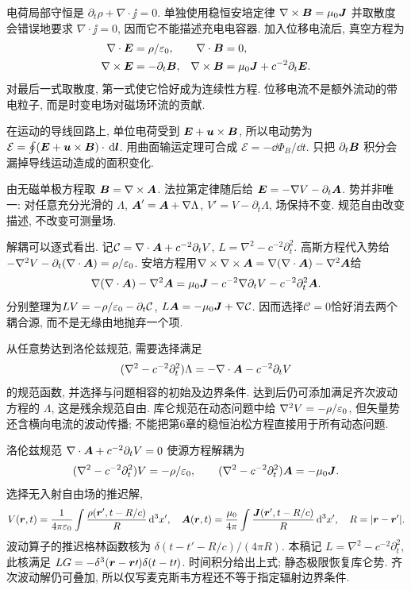 电荷局部守恒是 $\partial_t\rho+\nabla\cdot\jj=0$. 单独使用稳恒安培定律 $\nabla\times\boldsymbol{B}=\mu_0\boldsymbol{J}$ 并取散度会错误地要求 $\nabla\cdot\jj=0$, 因而它不能描述充电电容器. 加入位移电流后, 真空方程为
\begin{align}
\nabla\cdot\boldsymbol{E}&=\rho/\varepsilon_0,& \nabla\cdot\boldsymbol{B}&=0,\\
\nabla\times\boldsymbol{E}&=-\partial_t\boldsymbol{B},&
\nabla\times\boldsymbol{B}&=\mu_0\boldsymbol{J}+c^{-2}\partial_t\boldsymbol{E}.
\end{align}
对最后一式取散度, 第一式使它恰好成为连续性方程. 位移电流不是额外流动的带电粒子, 而是时变电场对磁场环流的贡献.

在运动的导线回路上, 单位电荷受到 $\boldsymbol{E}+\boldsymbol{u}\times\boldsymbol{B}$, 所以电动势为 $\mathcal E=\oint(\boldsymbol{E}+\boldsymbol{u}\times\boldsymbol{B})\cdot\,\mathrm d\boldsymbol{l}$. 用曲面输运定理可合成 $\mathcal E=-\dd\Phi_B/\dd t$. 只把 $\partial_t\boldsymbol{B}$ 积分会漏掉导线运动造成的面积变化.

由无磁单极方程取 $\boldsymbol{B}=\nabla\times\boldsymbol{A}$. 法拉第定律随后给 $\boldsymbol{E}=-\nabla V-\partial_t\boldsymbol{A}$. 势并非唯一: 对任意充分光滑的 $\Lambda$, $\boldsymbol{A}'=\boldsymbol{A}+\nabla\Lambda$, $V'=V-\partial_t\Lambda$, 场保持不变. 规范自由改变描述, 不改变可测量场.

解耦可以逐式看出. 记$\mathcal C=\nabla\cdot\boldsymbol{A}+c^{-2}\partial_tV$, $L=\nabla^2-c^{-2}\partial_t^2$. 高斯方程代入势给$-\nabla^2V-\partial_t(\nabla\cdot\boldsymbol{A})=\rho/\varepsilon_0$. 安培方程用$\nabla\times\nabla\times\boldsymbol{A}=\nabla(\nabla\cdot\boldsymbol{A})-\nabla^2\boldsymbol{A}$给
\[
\nabla(\nabla\cdot\boldsymbol{A})-\nabla^2\boldsymbol{A}
=\mu_0\boldsymbol{J}-c^{-2}\nabla\partial_tV-c^{-2}\partial_t^2\boldsymbol{A}.
\]
分别整理为$LV=-\rho/\varepsilon_0-\partial_t\mathcal C$, $L\boldsymbol{A}=-\mu_0\boldsymbol{J}+\nabla\mathcal C$. 因而选择$\mathcal C=0$恰好消去两个耦合源, 而不是无缘由地抛弃一个项.

从任意势达到洛伦兹规范, 需要选择满足
\[
(\nabla^2-c^{-2}\partial_t^2)\Lambda=-\nabla\cdot\boldsymbol{A}-c^{-2}\partial_tV
\]
的规范函数, 并选择与问题相容的初始及边界条件. 达到后仍可添加满足齐次波动方程的 $\Lambda$, 这是残余规范自由. 库仑规范在动态问题中给 $\nabla^2V=-\rho/\varepsilon_0$, 但矢量势还含横向电流的波动传播; 不能把第6章的稳恒泊松方程直接用于所有动态问题.

洛伦兹规范 $\nabla\cdot\boldsymbol{A}+c^{-2}\partial_tV=0$ 使源方程解耦为
\[
(\nabla^2-c^{-2}\partial_t^2)V=-\rho/\varepsilon_0,\qquad
(\nabla^2-c^{-2}\partial_t^2)\boldsymbol{A}=-\mu_0\boldsymbol{J}.
\]
选择无入射自由场的推迟解,
\[
V(\boldsymbol{r},t)=\frac1{4\pi\varepsilon_0}\int\frac{\rho(\boldsymbol{r}',t-R/c)}R\,\mathrm d^3x',\quad
\boldsymbol{A}(\boldsymbol{r},t)=\frac{\mu_0}{4\pi}\int\frac{\boldsymbol{J}(\boldsymbol{r}',t-R/c)}R\,\mathrm d^3x',
\quad R=|\boldsymbol{r}-\boldsymbol{r}'|.
\]
波动算子的推迟格林函数核为 $\delta(t-t'-R/c)/(4\pi R)$. 本稿记 $L=\nabla^2-c^{-2}\partial_t^2$, 此核满足 $LG=-\delta^3(\boldsymbol{r}-\boldsymbol{r}\,\!\prime)\delta(t-t\prime)$. 时间积分给出上式; 静态极限恢复库仑势. 齐次波动解仍可叠加, 所以仅写麦克斯韦方程还不等于指定辐射边界条件.

